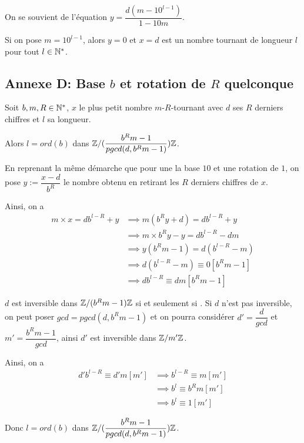 \documentclass[a4paper, 12pt]{article}
\begin{document}
On se souvient de l'équation $y = \dfrac{d(m - 10^{l - 1})}{1 - 10m}$.

Si on pose $m = 10^{l - 1}$, alors $y = 0$ et $x = d$ est un nombre tournant de longueur $l$ pour tout $l \in \mathbb{N}^*$.

\subsection*{Annexe D: Base $b$ et rotation de $R$ quelconque}

\begin{theoreme}{}{}
    Soit $b, m, R \in \mathbb{N}^*$, $x$ le plus petit nombre $m$-$R$-tournant avec $d$ ses $R$ derniers chiffres et $l$ sa longueur.

    Alors $l = ord(b)$ dans $\mathbb{Z}/(\dfrac{b^R m - 1}{pgcd(d, b^R m - 1)})\mathbb{Z}$.
\end{theoreme}

\begin{demonstration}
    En reprenant la même démarche que pour une la base $10$ et une rotation de $1$, on pose $y := \dfrac{x - d}{b^R}$ le nombre obtenu en retirant les $R$ derniers chiffres de $x$.

    Ainsi, on a
    \begin{align*}
        m \times x = d b^{l - R} + y &\implies m(b^R y + d) = d b^{l - R} + y \\
        &\implies m \times b^R y - y = d b^{l - R} - dm \\
        &\implies y(b^R m - 1) = d(b^{l - R} - m) \\
        &\implies d(b^{l - R} - m) \equiv 0 [b^R m - 1] \\
        &\implies d b^{l - R} \equiv dm [b^R m - 1]
    \end{align*}

    $d$ est inversible dans $\mathbb{Z}/(b^R m - 1)\mathbb{Z}$ si et seulement si .
    Si $d$ n'est pas inversible, on peut poser $gcd = pgcd(d, b^R m - 1)$ et on pourra considérer $d' = \dfrac{d}{gcd}$ et $m' = \dfrac{b^R m - 1}{gcd}$, ainsi $d'$ est inversible dans $\mathbb{Z}/m'\mathbb{Z}$.

    Ainsi, on a
    \begin{align*}
        d' b^{l - R} \equiv d'm [m'] &\implies b^{l - R} \equiv m [m'] \\
        &\implies b^l \equiv b^R m [m'] \\
        &\implies b^l \equiv 1 [m']
    \end{align*}

    Donc $l = ord(b)$ dans $\mathbb{Z}/(\dfrac{b^R m - 1}{pgcd(d, b^R m - 1)})\mathbb{Z}$.
\end{demonstration}
\end{document}
